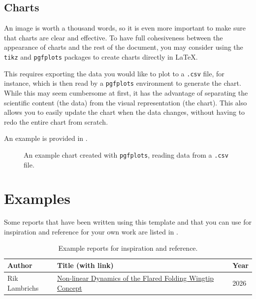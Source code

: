 \subsection{Charts}
An image is worth a thousand words, so it is even more important to make sure that charts are clear and effective.
To have full cohesiveness between the appearance of charts and the rest of the document, you may consider using the \texttt{tikz} and \texttt{pgfplots} packages to create charts directly in \LaTeX.


This requires exporting the data you would like to plot to a \texttt{.csv} file, for instance, which is then read by a \texttt{pgfplots} environment to generate the chart.
While this may seem cumbersome at first, it has the advantage of separating the scientific content (the data) from the visual representation (the chart).
This also allows you to easily update the chart when the data changes, without having to redo the entire chart from scratch.

An example is provided in .

\begin{figure}[bhtp]
    \centering
    
    \caption{An example chart created with \texttt{pgfplots}, reading data from a \texttt{.csv} file.}
        \label{fig:example-chart}
\end{figure}


\section{Examples}
Some reports that have been written using this template and that you can use for inspiration and reference for your own work are listed in .

\begin{table}[bhtp]
    \centering
    \caption{Example reports for inspiration and reference.}
    \label{tab:example-reports}
    \begin{tabular}{lll}
        \toprule
        \textbf{Author} & \textbf{Title (with link)} & \textbf{Year}\\
        \midrule
        Rik Lambrichs 
        & \href{https://resolver.tudelft.nl/uuid:8b3714f7-8ab0-4cc2-b0ea-5b9d02bd325f}{Non-linear Dynamics of the Flared Folding Wingtip Concept} 
        & 2026 
        \\
        \bottomrule
    \end{tabular}
\end{table}